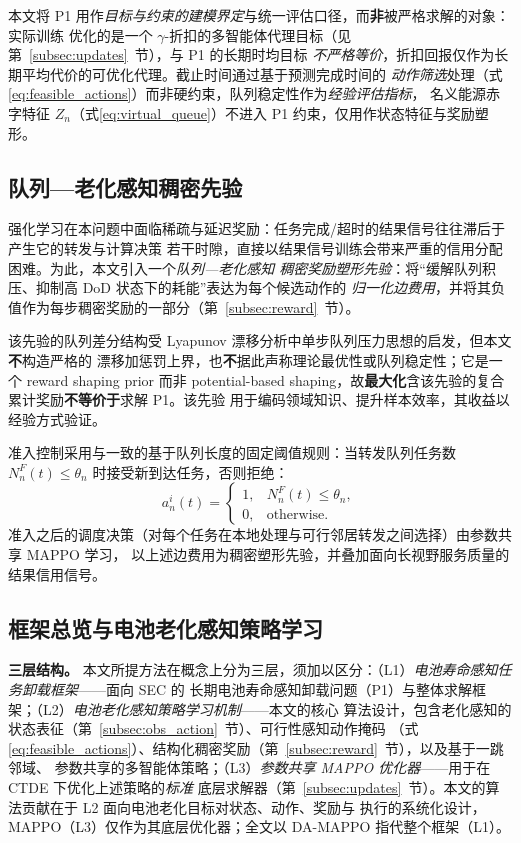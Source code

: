 \documentclass[a4paper,11pt]{article}
\begin{document}
本文将 P1 用作\emph{目标与约束的建模界定}与统一评估口径，而\textbf{非}被严格求解的对象：实际训练
优化的是一个 $\gamma$-折扣的多智能体代理目标（见第~\ref{subsec:updates}~节），与 P1 的长期时均目标
\emph{不严格等价}，折扣回报仅作为长期平均代价的可优化代理。截止时间通过基于预测完成时间的
\emph{动作筛选}处理（式\eqref{eq:feasible_actions}）而非硬约束，队列稳定性作为\emph{经验评估指标}，
名义能源赤字特征 $Z_n$（式\eqref{eq:virtual_queue}）不进入 P1 约束，仅用作状态特征与奖励塑形。

\subsection{队列—老化感知稠密先验}
\label{subsec:prior}

强化学习在本问题中面临稀疏与延迟奖励：任务完成/超时的结果信号往往滞后于产生它的转发与计算决策
若干时隙，直接以结果信号训练会带来严重的信用分配困难。为此，本文引入一个\emph{队列—老化感知
稠密奖励塑形先验}：将``缓解队列积压、抑制高 DoD 状态下的耗能''表达为每个候选动作的
\emph{归一化边费用}，并将其负值作为每步稠密奖励的一部分（第~\ref{subsec:reward}~节）。

该先验的队列差分结构受 Lyapunov 漂移分析中单步队列压力思想的启发，但本文\textbf{不}构造严格的
漂移加惩罚上界，也\textbf{不}据此声称理论最优性或队列稳定性；它是一个 reward shaping prior 而非
potential-based shaping，故\textbf{最大化}含该先验的复合累计奖励\textbf{不等价于}求解 P1。该先验
用于编码领域知识、提升样本效率，其收益以经验方式验证。

准入控制采用与\cite{zhang2024mhspo}一致的基于队列长度的固定阈值规则：当转发队列任务数
$N^F_n(t) \le \theta_n$ 时接受新到达任务，否则拒绝：
\begin{equation}
a^i_n(t) = \begin{cases} 1, & N^F_n(t) \leq \theta_n, \\ 0, & \text{otherwise.} \end{cases}
\label{eq:admission}
\end{equation}
准入之后的调度决策（对每个任务在本地处理与可行邻居转发之间选择）由参数共享 MAPPO 学习，
以上述边费用为稠密塑形先验，并叠加面向长视野服务质量的结果信用信号。

\subsection{框架总览与电池老化感知策略学习}
\label{subsec:mappo}

\noindent\textbf{三层结构。}
本文所提方法在概念上分为三层，须加以区分：（L1）\emph{电池寿命感知任务卸载框架}——面向 SEC 的
长期电池寿命感知卸载问题（P1）与整体求解框架；（L2）\emph{电池老化感知策略学习机制}——本文的核心
算法设计，包含老化感知的状态表征（第~\ref{subsec:obs_action}~节）、可行性感知动作掩码
（式\eqref{eq:feasible_actions}）、结构化稠密奖励（第~\ref{subsec:reward}~节），以及基于一跳邻域、
参数共享的多智能体策略；（L3）\emph{参数共享 MAPPO 优化器}——用于在 CTDE 下优化上述策略的\emph{标准}
底层求解器（第~\ref{subsec:updates}~节）。本文的算法贡献在于 L2 面向电池老化目标对状态、动作、奖励与
执行的系统化设计，MAPPO（L3）仅作为其底层优化器；全文以 DA-MAPPO 指代整个框架（L1）。
\end{document}
